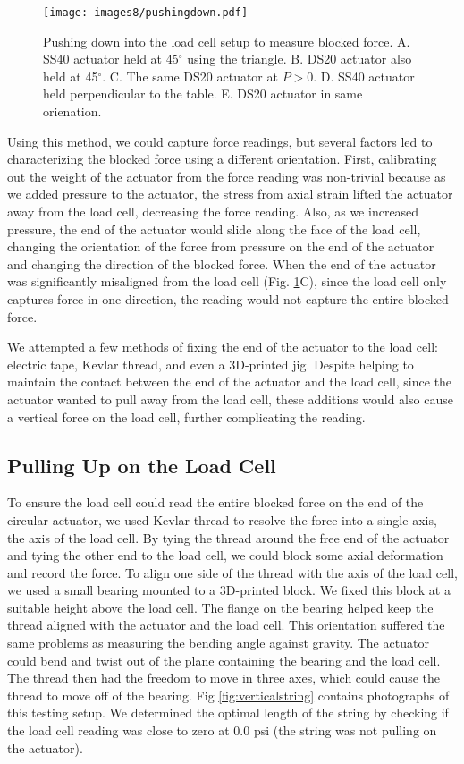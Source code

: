 \begin{figure}[!ht]
    \centering
     \texttt{[image: images8/pushingdown.pdf]}
    \caption{Pushing down into the load cell setup to measure blocked force. A. SS40 actuator held at 45$^\circ$ using the triangle. B. DS20 actuator also held at 45$^\circ$. C. The same DS20 actuator at $P>0$. D. SS40 actuator held perpendicular to the table. E. DS20 actuator in same orienation.}
    \label{fig:pushingdown}
\end{figure}

Using this method, we could capture force readings, but several factors led to characterizing the blocked force using a different orientation. First, calibrating out the weight of the actuator from the force reading was non-trivial because as we added pressure to the actuator, the stress from axial strain lifted the actuator away from the load cell, decreasing the force reading. Also, as we increased pressure, the end of the actuator would slide along the face of the load cell, changing the orientation of the force from pressure on the end of the actuator and changing the direction of the blocked force. When the end of the actuator was significantly misaligned from the load cell (Fig. \ref{fig:pushingdown}C), since the load cell only captures force in one direction, the reading would not capture the entire blocked force. 

We attempted a few methods of fixing the end of the actuator to the load cell: electric tape, Kevlar thread, and even a 3D-printed jig. Despite helping to maintain the contact between the end of the actuator and the load cell, since the actuator wanted to pull away from the load cell, these additions would also cause a vertical force on the load cell, further complicating the reading. 

\subsection{Pulling Up on the Load Cell}

To ensure the load cell could read the entire blocked force on the end of the circular actuator, we used Kevlar thread to resolve the force into a single axis, the axis of the load cell. By tying the thread around the free end of the actuator and tying the other end to the load cell, we could block some axial deformation and record the force. To align one side of the thread with the axis of the load cell, we used a small bearing mounted to a 3D-printed block. We fixed this block at a suitable height above the load cell. The flange on the bearing helped keep the thread aligned with the actuator and the load cell. This orientation suffered the same problems as measuring the bending angle against gravity. The actuator could bend and twist out of the plane containing the bearing and the load cell. The thread then had the freedom to move in three axes, which could cause the thread to move off of the bearing. Fig \ref{fig:verticalstring} contains photographs of this testing setup. We determined the optimal length of the string by checking if the load cell reading was close to zero at 0.0 psi (the string was not pulling on the actuator). 

